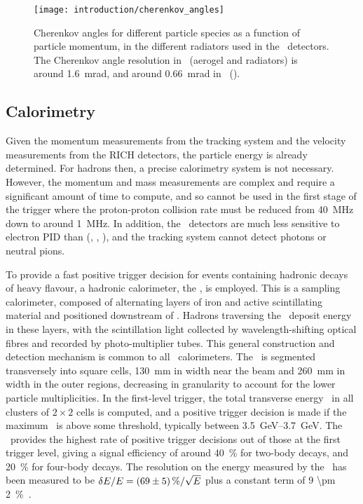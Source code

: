 \begin{figure}
  \centering
  \texttt{[image: introduction/cherenkov\_angles]}
  \caption{%
    Cherenkov angles for different particle species as a function of particle 
    momentum, in the different radiators used in the \rich\ detectors.
    The Cherenkov angle resolution in \richone~(aerogel and  
    radiators) is around \SI{1.6}{\milli\radian}, and around 
    \SI{0.66}{\milli\radian} in \richtwo~().
  }
  \label{fig:intro:lhcb:cherenkov_angles}
\end{figure}

\subsection{Calorimetry}
\label{chap:intro:lhcb:detector:calo}

Given the momentum measurements from the tracking system and the velocity 
measurements from the \ac{RICH} detectors, the particle energy is already 
determined.
For hadrons then, a precise calorimetry system is not necessary.
However, the momentum and mass measurements are complex and require a 
significant amount of time to compute, and so cannot be used in the first stage 
of the trigger where the proton-proton collision rate must be reduced from 
\SI{40}{\mega\hertz} down to around \SI{1}{\mega\hertz}.
In addition, the \rich\ detectors are much less sensitive to electron \ac{PID} 
than (\Ppi, \PK, \Pproton), and the tracking system cannot detect photons or 
neutral pions.

To provide a fast positive trigger decision for events containing hadronic 
decays of heavy flavour, a hadronic calorimeter, the \hcal, is employed.
This is a sampling calorimeter, composed of alternating layers of iron and 
active scintillating material and positioned downstream of \richtwo.
Hadrons traversing the \hcal\ deposit energy in these layers, with the 
scintillation light collected by wavelength-shifting optical fibres and 
recorded by photo-multiplier tubes.
This general construction and detection mechanism is common to all \lhcb\ 
calorimeters.
The \hcal\ is segmented transversely into square cells, \SI{130}{\milli\metre} 
in width near the beam and \SI{260}{\milli\metre} in width in the outer 
regions, decreasing in granularity to account for the lower particle 
multiplicities.
In the first-level trigger, the total transverse energy \ET\ in all clusters of 
$2\times2$ cells is computed, and a positive trigger decision is made if the 
maximum \ET\ is above some threshold, typically between 
\SIrange{3.5}{3.7}{\GeV}.
The \hcal\ provides the highest rate of positive trigger decisions out of those 
at the first trigger level, giving a signal efficiency of around 
\SI{40}{\percent} for two-body \PB decays, and \SI{20}{\percent} for four-body 
\PD decays.
The resolution on the energy measured by the \hcal\ has been measured to be 
$\unc{E}/E = \SI{69 \pm 5}{\percent}/\sqrt{E}$ plus a constant term of \SI{9 
  \pm 2}{\percent}~\cite{Perret:2015pla}.

